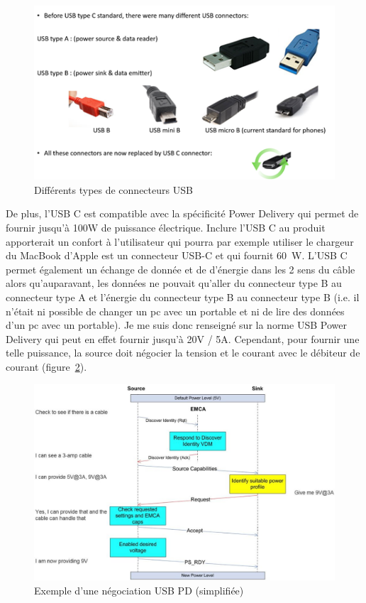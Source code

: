 \documentclass[a4paper, 12pt]{report}
\begin{document}
\begin{figure}[H]
\centering
\includegraphics[scale=0.75]{figures/screenshots/different_usb_types.png}
\caption{Différents types de connecteurs USB}
\label{fig:usb_type}
\end{figure}

De plus, l’USB C est compatible avec la spécificité Power Delivery qui permet de fournir jusqu’à 100W de puissance électrique. Inclure l’USB C au produit apporterait un confort à l’utilisateur qui pourra par exemple utiliser le chargeur du MacBook d’Apple est un connecteur USB-C et qui fournit \SI{60}{\watt}.
L'USB C permet également un échange de donnée et de d'énergie dans les 2 sens du câble alors qu'auparavant, les données ne pouvait qu'aller du connecteur type B au connecteur type A et l'énergie du connecteur type B au connecteur type B (i.e. il n'était ni possible de changer un pc avec un portable et ni de lire des données d'un pc avec un portable).
Je me suis donc renseigné sur la norme USB Power Delivery qui peut en effet fournir jusqu’à 20V / 5A. Cependant, pour fournir une telle puissance, la source doit négocier la tension et le courant avec le débiteur de courant (figure~\ref{fig:usb_pd_negociation}).

\begin{figure}[H]
\centering
\includegraphics[scale=0.35]{figures/screenshots/usb_pd_nego.png}
\caption{Exemple d’une négociation USB PD (simplifiée) \cite{usb_pd_nego}}
\label{fig:usb_pd_negociation}
\end{figure}
\end{document}
